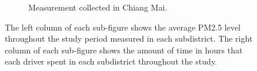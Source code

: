 \begin{figure}[t]
\begin{subfigure}[t]{0.49\textwidth}
        \caption{Measurement collected in Chiang Mai.}
    \end{subfigure}%

    \caption{
    The left column of each sub-figure shows the average PM2.5 level throughout the study period measured in each subdistrict.
    The right column of each sub-figure shows the amount of time in hours that each driver spent in each subdistrict throughout the study.
    }
    \Description{}
    \label{fig:subdistrict-aqi}
\end{figure}


